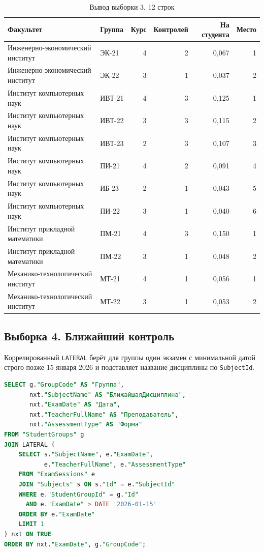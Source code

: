 \documentclass[12pt,a4paper]{article}
\begin{document}
\begin{table}[H]
\centering
\caption{Вывод выборки 3, 12 строк}
\footnotesize
\begin{tabular}{p{}lrrrr}
\toprule
Факультет & Группа & Курс & Контролей & На студента & Место \\
\midrule
Инженерно-экономический институт & ЭК-21 & 4 & 2 & 0,067 & 1 \\
Инженерно-экономический институт & ЭК-22 & 3 & 1 & 0,037 & 2 \\
Институт компьютерных наук & ИВТ-21 & 4 & 3 & 0,125 & 1 \\
Институт компьютерных наук & ИВТ-22 & 3 & 3 & 0,115 & 2 \\
Институт компьютерных наук & ИВТ-23 & 2 & 3 & 0,107 & 3 \\
Институт компьютерных наук & ПИ-21 & 4 & 2 & 0,091 & 4 \\
Институт компьютерных наук & ИБ-23 & 2 & 1 & 0,043 & 5 \\
Институт компьютерных наук & ПИ-22 & 3 & 1 & 0,040 & 6 \\
Институт прикладной математики & ПМ-21 & 4 & 3 & 0,150 & 1 \\
Институт прикладной математики & ПМ-22 & 3 & 1 & 0,048 & 2 \\
Механико-технологический институт & МТ-21 & 4 & 1 & 0,056 & 1 \\
Механико-технологический институт & МТ-22 & 3 & 1 & 0,053 & 2 \\
\bottomrule
\end{tabular}
\end{table}

\subsection*{Выборка 4. Ближайший контроль}
Коррелированный \texttt{LATERAL} берёт для группы один экзамен с минимальной датой строго позже 15 января 2026 и подставляет название дисциплины по \texttt{SubjectId}.

\begin{lstlisting}[language=SQL]
SELECT g."GroupCode" AS "Группа",
       nxt."SubjectName" AS "БлижайшаяДисциплина",
       nxt."ExamDate" AS "Дата",
       nxt."TeacherFullName" AS "Преподаватель",
       nxt."AssessmentType" AS "Форма"
FROM "StudentGroups" g
JOIN LATERAL (
    SELECT s."SubjectName", e."ExamDate",
           e."TeacherFullName", e."AssessmentType"
    FROM "ExamSessions" e
    JOIN "Subjects" s ON s."Id" = e."SubjectId"
    WHERE e."StudentGroupId" = g."Id"
      AND e."ExamDate" > DATE '2026-01-15'
    ORDER BY e."ExamDate"
    LIMIT 1
) nxt ON TRUE
ORDER BY nxt."ExamDate", g."GroupCode";
\end{lstlisting}
\end{document}
